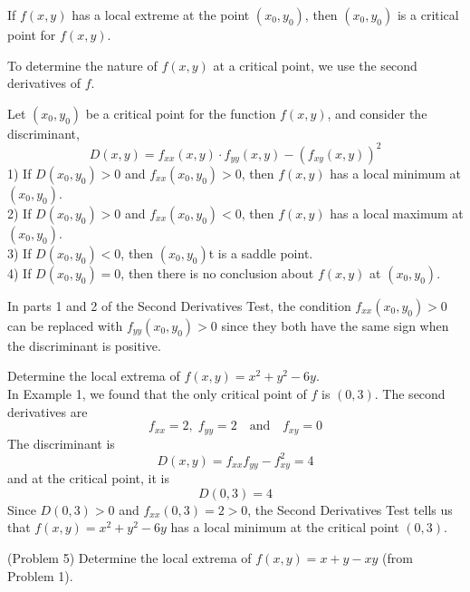 \documentclass[handout]{ximera}
\begin{document}
\begin{theorem}
If $f(x,y)$ has a local extreme at the point $(x_0, y_0)$, then $(x_0, y_0)$ is a critical point for $f(x,y)$.
\end{theorem}

To determine the nature of $f(x,y)$ at a critical point, we use the second derivatives of $f$.

\begin{theorem}
Let $(x_0, y_0)$ be a critical point for the function $f(x,y)$, and consider the discriminant,
\[
D(x,y) = f_{xx}(x,y) \cdot f_{yy}(x,y) - \left(f_{xy}(x,y)\right)^2
\]
1) If $D(x_0, y_0) > 0$ and $f_{xx}(x_0, y_0) > 0$, then $f(x,y)$ has a local minimum at $(x_0, y_0)$.\\
2) If $D(x_0, y_0) > 0$ and $f_{xx}(x_0, y_0)< 0$, then $f(x,y)$ has a local maximum at $(x_0, y_0)$.\\
3) If $D(x_0, y_0) < 0$, then $(x_0, y_0)$t is a saddle point.\\
4) If $D(x_0, y_0) = 0$, then there is no conclusion about $f(x,y)$ at $(x_0, y_0)$.\\
\end{theorem}

\begin{remark}
In parts 1 and 2 of the Second Derivatives Test, the condition $f_{xx}(x_0, y_0) > 0$ can be 
replaced with $f_{yy}(x_0, y_0) > 0$ since they both have the same sign when the discriminant is positive.
\end{remark}

\begin{example}[Example 5]
Determine the local extrema of  $f(x,y) = x^2 + y^2 - 6y$.\\
In Example 1, we found that the only critical point of $f$ is $(0,3)$.
The second derivatives are
\[
f_{xx} = 2,\; f_{yy} = 2 \quad \text{and} \quad f_{xy} = 0
\]
The discriminant is
\[
D(x,y) = f_{xx} f_{yy} - f_{xy}^2 = 4
\]
and at the critical point, it is
\[
D(0,3) = 4
\]
Since $D(0, 3) > 0$ and $f_{xx}(0,3) = 2 > 0$, the Second Derivatives Test tells us that $f(x,y) = x^2 + y^2 - 6y$
has a local minimum at the critical point $(0,3)$.
\end{example}

\begin{problem}(Problem 5)
Determine the local extrema of $f(x,y) = x+ y - xy$ (from Problem 1).\\
\end{problem}
\end{document}
